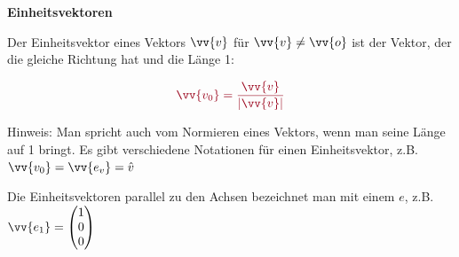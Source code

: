 \begin{tcolorbox}
	\textbf{Einheitsvektoren}
	
	\textcolor{loestc}{Der Einheitsvektor eines Vektors \(\vv{v}\) für \(\vv{v}\neq \vv{o}\) ist der Vektor, der die gleiche Richtung hat und die Länge 1:}
	
	\[\textcolor{loestc}{\vv{v_0}=\frac{\vv{v}}{\abs{\vv{v}}}}\]
	
	\bigskip
	
\end{tcolorbox}
Hinweis: Man spricht auch vom Normieren eines Vektors, wenn man seine Länge auf 1 bringt. Es gibt verschiedene Notationen für einen Einheitsvektor, z.B. \(\vv{v_0}=\vv{e_v}=\hat{v}\)

Die Einheitsvektoren parallel zu den Achsen bezeichnet man mit einem \(e\), z.B. \(\vv{e_1}=\spvvv{1}{0}{0}\)
%	
